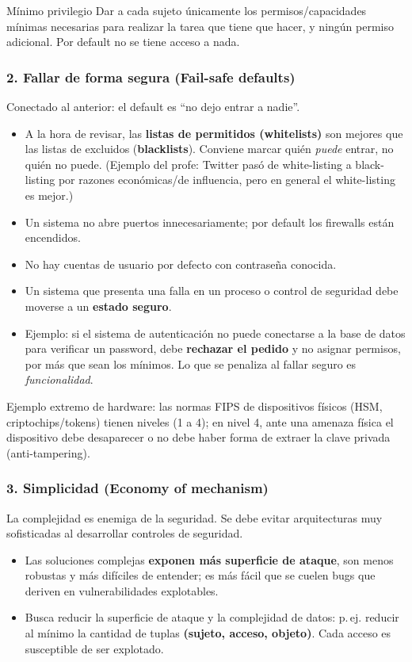 \documentclass[../main.tex]{subfiles}
\begin{document}
\begin{definicion}{Mínimo privilegio}
Dar a cada sujeto únicamente los permisos/capacidades mínimas necesarias para realizar la tarea que tiene que hacer, y ningún permiso adicional. Por default no se tiene acceso a nada.
\end{definicion}

\subsubsection{2. Fallar de forma segura (Fail-safe defaults)}
Conectado al anterior: el default es ``no dejo entrar a nadie''.
\begin{itemize}
  \item A la hora de revisar, las \textbf{listas de permitidos (whitelists)} son mejores que las listas de excluidos (\textbf{blacklists}). Conviene marcar quién \emph{puede} entrar, no quién no puede. (Ejemplo del profe: Twitter pasó de white-listing a black-listing por razones económicas/de influencia, pero en general el white-listing es mejor.)
  \item Un sistema no abre puertos innecesariamente; por default los firewalls están encendidos.
  \item No hay cuentas de usuario por defecto con contraseña conocida.
  \item Un sistema que presenta una falla en un proceso o control de seguridad debe moverse a un \textbf{estado seguro}.
  \item Ejemplo: si el sistema de autenticación no puede conectarse a la base de datos para verificar un password, debe \textbf{rechazar el pedido} y no asignar permisos, por más que sean los mínimos. Lo que se penaliza al fallar seguro es \emph{funcionalidad}.
\end{itemize}
Ejemplo extremo de hardware: las normas FIPS de dispositivos físicos (HSM, criptochips/tokens) tienen niveles (1 a 4); en nivel 4, ante una amenaza física el dispositivo debe desaparecer o no debe haber forma de extraer la clave privada (anti-tampering).

\subsubsection{3. Simplicidad (Economy of mechanism)}
La complejidad es enemiga de la seguridad. Se debe evitar arquitecturas muy sofisticadas al desarrollar controles de seguridad.
\begin{itemize}
  \item Las soluciones complejas \textbf{exponen más superficie de ataque}, son menos robustas y más difíciles de entender; es más fácil que se cuelen bugs que deriven en vulnerabilidades explotables.
  \item Busca reducir la superficie de ataque y la complejidad de datos: p.\,ej. reducir al mínimo la cantidad de tuplas \textbf{(sujeto, acceso, objeto)}. Cada acceso es susceptible de ser explotado.
\end{itemize}
\end{document}
